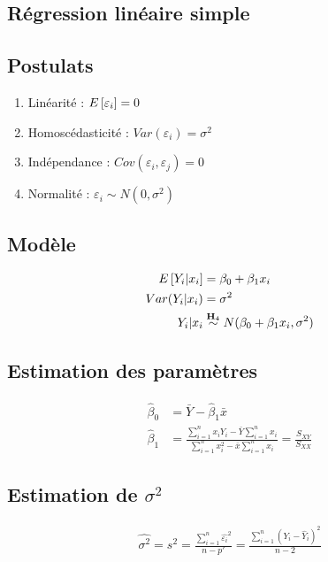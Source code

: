 \documentclass[10pt, french]{article}
\begin{document}
\small
\begin{multicols*}{3} %
\section{Régression linéaire simple}
\subsection*{Postulats}
\begin{enumerate}[label=$\mathbf{H}_{\arabic*}$]
\item Linéarité : $E \left[ \varepsilon_i \right] = 0$
\item Homoscédasticité : $Var(\varepsilon_i)= \sigma^2$
\item Indépendance : $Cov(\varepsilon_i, \varepsilon_j) = 0$
\item Normalité : $\varepsilon_i \sim N(0, \sigma^2)$
\end{enumerate}
\subsection*{Modèle}
\begin{align*}
E \left[ Y_i | x_i \right] 	& = \beta_0 + \beta_1 x_i \\
Var(Y_i | x_i)	& = \sigma^2 \\
Y_i | x_i & \overset{\mathbf{H}_4}{\sim} N(\beta_0 + \beta_1 x_i, \sigma^2) \\
\end{align*}

\subsection*{Estimation des paramètres}
\begin{align*}
\hat{\beta}_0 	& = \bar{Y} - \hat{\beta}_1 \bar{x} \\
\hat{\beta}_1	& = \frac{\sum_{i=1}^{n} x_i Y_i - \bar{Y} \sum_{i=1}^{n} x_i}{\sum_{i=1}^{n} x_i^2 - \bar{x} \sum_{i=1}^{n} x_i} = \frac{S_{XY}}{S_{XX}}
\end{align*}

\subsection*{Estimation de $\sigma^2$}
\begin{align*}
\hat{\sigma^2} = s^2 = \frac{\sum_{i=1}^{n} \hat{\varepsilon_i}^2}{n-p'} = \frac{\sum_{i=1}^{n} (Y_i - \hat{Y}_i)^2}{n-2}
\end{align*}


\end{multicols*}
\end{document}
